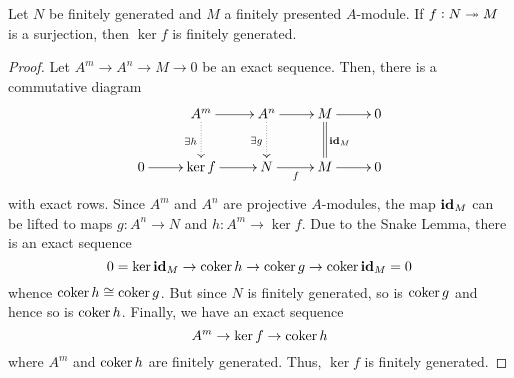 \begin{proposition}
    Let $N$ be finitely generated and $M$ a finitely presented $A$-module. If $f: N\twoheadrightarrow M$ is a surjection, then $\ker f$ is finitely generated.
\end{proposition}
\begin{proof}
    Let $A^m\to A^n\to M\to 0$ be an exact sequence. Then, there is a commutative diagram
    \begin{equation*}
        \xymatrix {
            & A^m\ar[r]\ar@{.>}[d]_{\exists h} & A^n\ar[r]\ar@{.>}[d]_{\exists g} & M\ar[r]\ar@{=}[d]^{\id_M} & 0\\
            0\ar[r] & \ker f\ar[r] & N\ar[r]_f & M\ar[r] & 0
        }
    \end{equation*}
    with exact rows. Since $A^m$ and $A^n$ are projective $A$-modules, the map $\mathbf{id}_M$ can be lifted to maps $g: A^n\to N$ and $h: A^m\to\ker f$. Due to the Snake Lemma, there is an exact sequence 
    \begin{equation*}
        0 = \ker\mathbf{id}_M\to\operatorname{coker} h\to\operatorname{coker} g\to\operatorname{coker}\mathbf{id}_M = 0
    \end{equation*}
    whence $\operatorname{coker} h\cong\operatorname{coker} g$. But since $N$ is finitely generated, so is $\operatorname{coker} g$ and hence so is $\operatorname{coker} h$. Finally, we have an exact sequence 
    \begin{equation*}
        A^m\to\ker f\to\operatorname{coker} h
    \end{equation*}
    where $A^m$ and $\operatorname{coker} h$ are finitely generated. Thus, $\ker f$ is finitely generated.
\end{proof}